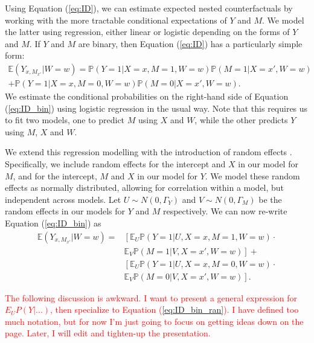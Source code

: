 \documentclass{article}
\newcommand{\bP}{\mathbb{P}}
\newcommand{\bE}{\mathbb{E}}
\begin{document}
Using Equation (\ref{eq:ID}), we can estimate expected nested counterfactuals by working with the more tractable conditional expectations of $Y$ and $M$. We model the latter using regression, either linear or logistic depending on the forms of $Y$ and $M$. If $Y$ and $M$ are binary, then Equation (\ref{eq:ID}) has a particularly simple form:
%
\begin{multline}
    \bE (Y_{x, M_{x'}} | W=w) = \bP \left( Y=1 | X=x, M=1, W=w \right) \bP(M=1 | X = x', W=w) \\ + \bP \left( Y=1 | X=x, M=0, W=w \right) \bP(M=0 | X = x', W=w). \label{eq:ID_bin}
\end{multline}
%
We estimate the conditional probabilities on the right-hand side of Equation (\ref{eq:ID_bin}) using logistic regression in the usual way. Note that this requires us to fit two models, one to predict $M$ using $X$ and $W$, while the other predicts $Y$ using $M$, $X$ and $W$.

We extend this regression modelling with the introduction of random effects \citep[see, e.g.][]{Dem04}. Specifically, we include random effects for the intercept and $X$ in our model for $M$, and for the intercept, $M$ and $X$ in our model for $Y$. We model these random effects as normally distributed, allowing for correlation within a model, but independent across models. Let $U \sim N(0, \Gamma_Y)$ and $V \sim N(0, \Gamma_M)$ be the random effects in our models for $Y$ and $M$ respectively. We can now re-write Equation (\ref{eq:ID_bin}) as
%
\begin{align}
    \bE (Y_{x, M_{x'}} | W=w) = & \left[\bE_U \bP \left( Y=1 |U, X=x, M=1, W=w \right) \right. \cdot \label{eq:ID_bin_ran}\\
    &  \left. \bE_V \bP(M=1 |V, X = x', W=w)\right] + \nonumber \\ 
    & \left[ \bE_U \bP \left( Y=1 |U, X=x, M=0, W=w \right) \right. \cdot \nonumber \\
    & \left. \bE_V \bP(M=0 |V, X = x', W=w) \right]. \nonumber 
\end{align}
%











\textcolor{red}{The following discussion is awkward. I want to present a general expression for $E_U P(Y | ...)$, then specialize to Equation (\ref{eq:ID_bin_ran}). I have defined too much notation, but for now I'm just going to focus on getting ideas down on the page. Later, I will edit and tighten-up the presentation.}
\end{document}
